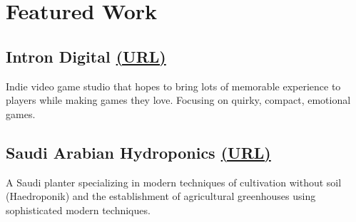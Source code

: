 \section*{Featured Work}
%
%
%
\subsection*{
  Intron Digital
  \small\grayColor
  \href{https://introndigital.com/}{(URL)}
}
Indie video game studio that hopes to bring lots of memorable experience to players while making games they love. Focusing on quirky, compact, emotional games.
%
%
\subsection*{
  Saudi Arabian Hydroponics
  \small\grayColor
  \href{https://zarei.com.sa/}{(URL)}
}
A Saudi planter specializing in modern techniques of cultivation without soil (Haedroponik) and the establishment of agricultural greenhouses using sophisticated modern techniques.